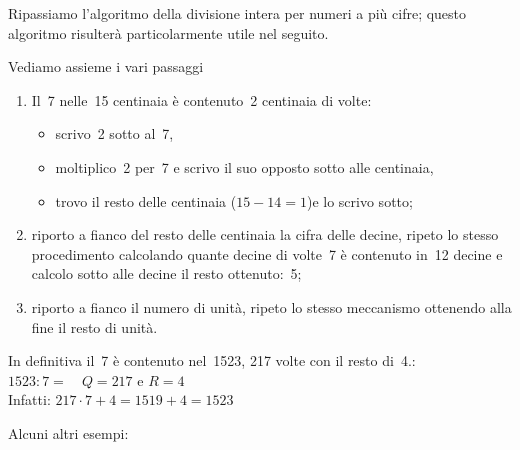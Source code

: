 Ripassiamo l'algoritmo della divisione intera per numeri a più cifre; 
questo algoritmo risulterà particolarmente utile nel seguito.

\vspace{-6pt}
\begin{center}
\begin{inaccessibleblock}
 
\end{inaccessibleblock}
\end{center}
\vspace{-12pt}

Vediamo assieme i vari passaggi
\begin{enumerate} [noitemsep]
 \item Il~7 nelle~15 centinaia è contenuto~2 centinaia di volte:
   \begin{itemize} [nosep]
    \item scrivo~2 sotto al~7,
    \item moltiplico~2 per~7 e scrivo il suo opposto sotto alle centinaia,
    \item trovo il resto delle centinaia (\(15-14=1\))e lo scrivo sotto;
   \end{itemize}
 \item riporto a fianco del resto delle centinaia la cifra delle decine, 
ripeto lo stesso procedimento calcolando quante decine di volte~7 è 
contenuto in~12 decine e calcolo sotto alle decine il resto ottenuto:~5;
 \item riporto a fianco il numero di unità, ripeto lo stesso meccanismo 
ottenendo alla fine il resto di unità.
\end{enumerate}

In definitiva il~7 è contenuto nel~1523, 217 volte con il resto di~4.:\\
\(1523:7=\quad Q=217 \text{ e } R=4\)\\
Infatti: \(217 \cdot 7 + 4 = 1519 + 4 = 1523\)

\newpage

Alcuni altri esempi:

\vspace{-6pt}
\begin{center}
\begin{inaccessibleblock}
 
\end{inaccessibleblock}
\end{center}
\vspace{-12pt}

